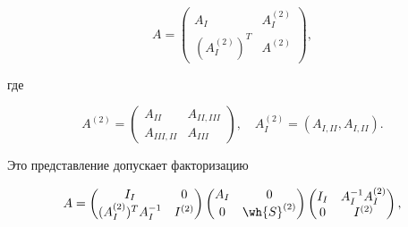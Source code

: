 \begin{equation}\label{eq6.15}


A =


\begin{pmatrix}


A_I & A^{(2)}_I\\


(A^{(2)}_I)^T & A^{(2)}


\end{pmatrix}


,


\end{equation}


где 


$$


A^{(2)} =


\begin{pmatrix}


A_{II} & A_{II,III}\\


A_{III,II} & A_{III}


\end{pmatrix}


,


\quad A^{(2)}_I = (A_{I,II}, A_{I,II}).


$$


Это представление допускает факторизацию


\begin{equation}\label{eq6.16}


A =


\begin{pmatrix}


I_I & 0\\


(A^{(2)}_I)^TA^{-1}_I & I^{(2)}


\end{pmatrix}


\begin{pmatrix}


A_I & 0\\


0 & \wh{S}^{(2)}


\end{pmatrix}


\begin{pmatrix}


I_I & A^{-1}_I A^{(2)}_I\\


0 & I^{(2)}


\end{pmatrix}


,


\end{equation}


